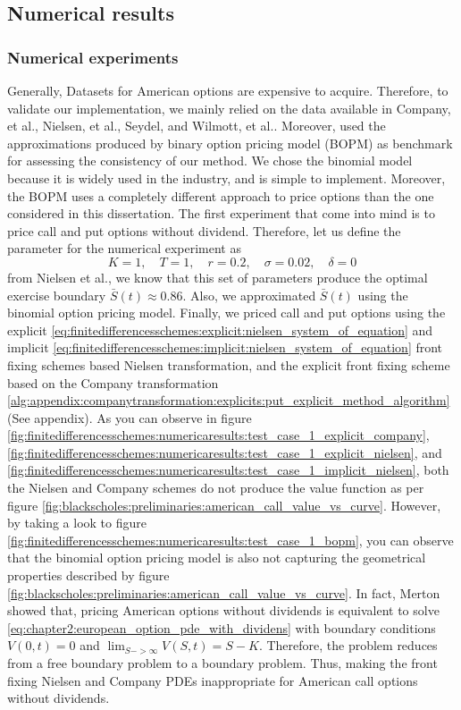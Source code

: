\subsection{Numerical results}
\subsubsection{Numerical experiments}
Generally, Datasets for American options are expensive to acquire. Therefore, to validate our implementation, we mainly relied on the data available in Company, 
et al.\cite*{company_egorova_jodar_2014}, Nielsen, et al.\cite*{nielsen_2001}, Seydel\cite*{seydel_2009}, and Wilmott, et al.\cite*{dewynne_howison_wilmott_howison_1995}. Moreover, used the approximations produced by binary option pricing model\cite{cox_1979} (BOPM)  as benchmark for assessing the consistency of our method. We chose the binomial model because it is widely used in the industry, and is simple to implement. Moreover, the BOPM uses a completely different approach to price options than the one considered in this dissertation. The first experiment that come into mind is to price call and put options without dividend. Therefore, let us define the parameter for the numerical experiment as
\begin{equation}
  \label{eq:numericaresults:parameters_set_1}
  K = 1, \quad T = 1, \quad r=0.2, \quad \sigma=0.02, \quad \delta = 0 
\end{equation}
from Nielsen et al.\cite{nielsen_2001}, we know that this set of parameters produce the optimal exercise boundary $\bar{S}(t) \approx 0.86$. Also, we approximated $\bar{S}(t)$ using the binomial option pricing model. Finally, we priced call and put options using the explicit  \eqref{eq:finitedifferencesschemes:explicit:nielsen_system_of_equation} and implicit \eqref{eq:finitedifferencesschemes:implicit:nielsen_system_of_equation} front fixing schemes based Nielsen transformation, and the explicit front fixing scheme based on the Company transformation \eqref{alg:appendix:companytransformation:explicits:put_explicit_method_algorithm} (See appendix). As you can observe in figure \eqref{fig:finitedifferencesschemes:numericaresults:test_case_1_explicit_company},
\eqref{fig:finitedifferencesschemes:numericaresults:test_case_1_explicit_nielsen}, and \eqref{fig:finitedifferencesschemes:numericaresults:test_case_1_implicit_nielsen},
both the Nielsen and Company schemes do not produce the value function as per figure \eqref{fig:blackscholes:preliminaries:american_call_value_vs_curve}. However, by taking a look to figure \eqref{fig:finitedifferencesschemes:numericaresults:test_case_1_bopm}, you can observe that the binomial option pricing model is also not capturing the geometrical properties described by figure \eqref{fig:blackscholes:preliminaries:american_call_value_vs_curve}. In fact, Merton\cite{merton_1973} showed that, pricing American options without dividends is equivalent to solve \eqref{eq:chapter2:european_option_pde_with_dividens} with boundary conditions $V(0, t)=0$ and $\lim_{S->\infty}V(S,t)=S-K$. Therefore, the problem reduces from a free boundary problem to a boundary problem. Thus, making the front fixing Nielsen and Company PDEs inappropriate for American call options without dividends.
